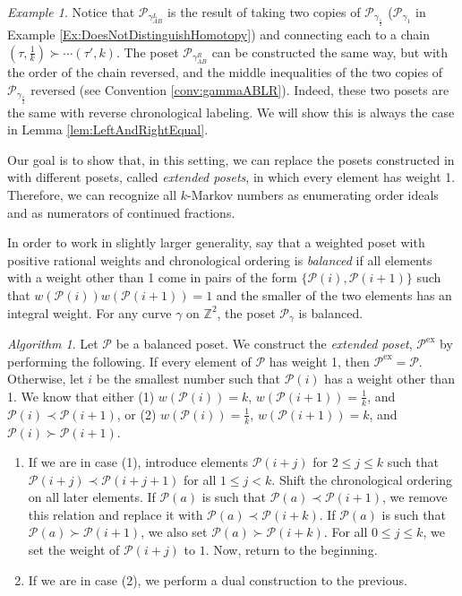 \documentclass[12pt, letterpaper,table]{amsart}
\theoremstyle{remark}
\newtheorem{example}[theorem]{Example}
\newtheorem{algorithm}[theorem]{Algorithm}
\newcommand{\calP}{\mathcal{P}}
\newcommand{\exx}{\mathrm{ex}}
\newcommand{\wt}{w}
\begin{document}
\begin{example}
Notice that $\calP_{\gamma_{AB}^L}$  is the result of taking two copies of $\calP_{\gamma_{\frac12}}$ ($\calP_{\gamma_1}$ in Example \ref{Ex:DoesNotDistinguishHomotopy}) and connecting each to a chain $(\tau,\frac{1}{k}) \succ \cdots  (\tau',k)$. The poset $\calP_{\gamma_{AB}^R}$ can be constructed the same way, but with the order of the chain reversed,  and the middle inequalities of the two copies of $\calP_{\gamma_{\frac12}}$ reversed (see Convention \ref{conv:gammaABLR}).  Indeed, these two posets are the same with reverse chronological labeling.  We will show this is always the case in Lemma \ref{lem:LeftAndRightEqual}.
\end{example}

Our goal is to show that, in this setting, we can replace the posets constructed in \cite{BG} with different posets, called \emph{extended posets}, in which every element has weight 1. Therefore, we can recognize all $k$-Markov numbers as enumerating order ideals and as numerators of continued fractions.

In order to work in slightly larger generality, say that a weighted poset with positive rational weights and chronological ordering is \emph{balanced} if all elements with a weight other than 1 come in pairs of the form $\{\calP(i),\calP(i+1)\}$ such that $\wt(\calP(i))\wt(\calP(i+1)) = 1$ and the smaller of the two elements has an integral weight. For any curve $\gamma$ on $\mathbb{Z}^2$, the poset $\calP_\gamma$ is balanced. 


\begin{algorithm}\label{algo:New}
Let $\calP$ be a balanced poset. We construct the \emph{extended poset}, $\calP^\exx$ by performing the following. If every element of $\calP$ has weight 1, then $\calP^\exx = \calP$. Otherwise, let $i$ be the smallest number such that $\calP(i)$ has a weight other than 1. We know that either (1) $\wt(\calP(i)) = k$, $\wt(\calP(i+1)) = \frac1k$, and $\calP(i) \prec \calP(i+1)$, or (2) $\wt(\calP(i)) = \frac1k$, $\wt(\calP(i+1)) = k$, and $\calP(i) \succ \calP(i+1)$. 
    \begin{enumerate}
    \item If we are in case (1), introduce elements $\calP(i+j)$ for $2 \leq j \leq k$ such that $\calP(i+j) \prec \calP(i+j+1)$ for all $1 \leq j < k$. Shift the chronological ordering on all later elements. If $\calP(a)$ is such that $\calP(a) \prec \calP(i+1)$, we remove this relation and replace it with $\calP(a) \prec \calP(i+k)$. If $\calP(a)$ is such that $\calP(a) \succ \calP(i+1)$, we also set $\calP(a) \succ \calP(i+k)$. For all $0 \leq j \leq k$, we set the  weight of $\calP(i+j)$ to $1$. Now, return to the beginning.
    \item If we are in case (2), we perform a dual construction to the previous. 
    \end{enumerate}

\end{algorithm}
\end{document}
